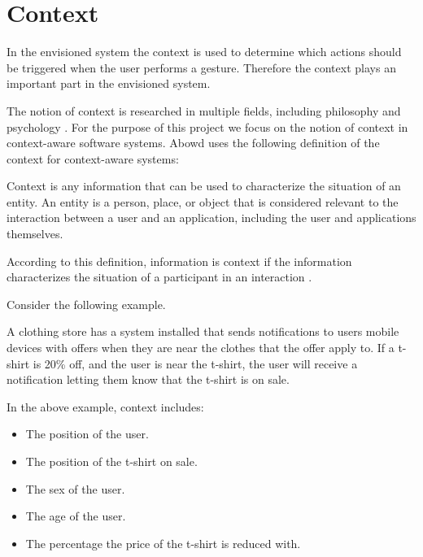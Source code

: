 \section{Context}
\label{sec:analysis:context}

In the envisioned system the context is used to determine which actions should be triggered when the user performs a gesture. Therefore the context plays an important part in the envisioned system.

The notion of context is researched in multiple fields, including philosophy and psychology \cite{bolchini2007data}. For the purpose of this project we focus on the notion of context in context-aware software systems. Abowd \etal\cite{abowd1999towards} uses the following definition of the context for context-aware systems:

\begin{italicquote}
Context is any information that can be used to characterize the situation of an entity. An entity is a person, place, or object that is considered relevant to the interaction between a user and an application, including the user and applications themselves.
\end{italicquote}

According to this definition, information is context if the information characterizes the situation of a participant in an interaction \cite{abowd1999towards}.

Consider the following example.

\begin{testexample}
A clothing store has a system installed that sends notifications to users mobile devices with offers when they are near the clothes that the offer apply to. If a t-shirt is 20\% off, and the user is near the t-shirt, the user will receive a notification letting them know that the t-shirt is on sale.
\end{testexample}

In the above example, context includes:

\begin{itemize}
\item The position of the user.
\item The position of the t-shirt on sale.
\item The sex of the user.
\item The age of the user.
\item The percentage the price of the t-shirt is reduced with.
\end{itemize}


